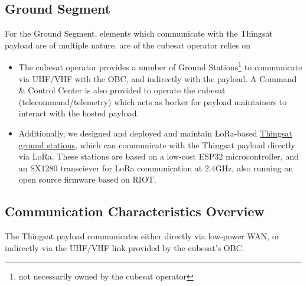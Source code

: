 \subsection*{Ground Segment}
For the Ground Segment, elements which communicate with the Thingsat payload are of multiple nature. are of the cubesat operator relies on 
\begin{itemize}
\item The cubesat operator provides a number of Ground Stations\footnote{not necessarily owned by the cubesat operator} to communicate via UHF/VHF with the OBC, and indirectly with the payload. 
A Command \& Control Center is also provided to operate the cubesat (telecommand/telemetry) which acts as borker for payload maintainers to interact with the hosted payload.
\item Additionally, we designed and deployed and maintain LoRa-based  \href{https://github.com/thingsat/tinygs_2g4station}{Thingsat ground stations}, which can communicate with the Thingsat payload directly via LoRa. These stations are based on a low-cost ESP32 microcontroller, and an SX1280 transciever for LoRa communication at 2.4GHz, also running an open source firmware based on RIOT.
\end{itemize}


\subsection{Communication Characteristics Overview}
\label{sec:thingsat-comm-characteristics}

The Thingsat payload communicates either directly via low-power WAN, or indirectly via the UHF/VHF link provided by the cubesat's OBC.


